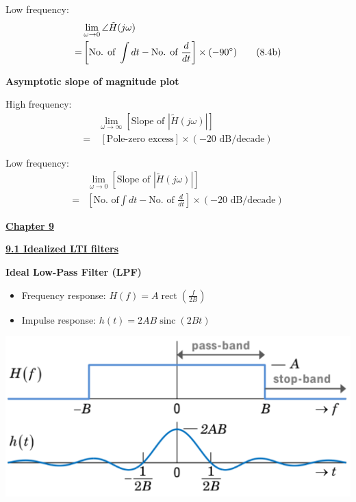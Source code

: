 \documentclass[landscape,a4paper]{extarticle}
\newenvironment{Figure}
  {\par\medskip\noindent\minipage{\linewidth}}
  {\endminipage\par\medskip}
\newcommand{\rect}[1]{\operatorname{rect}\left(#1\right)}
\newcommand{\sinc}[1]{\operatorname{sinc}\left(#1\right)}
\begin{document}
\begin{multicols*}{5}
    Low frequency:
    \begin{align*}
        &\lim_{\omega \to 0} \angle \tilde{H}(j \omega) \\
        =& \left[\text{No. of }\int dt - \text{No. of } \frac{d}{dt}\right] \times (-90 \degree) \tag{8.4b}
    \end{align*}

    \textbf{Asymptotic slope of magnitude plot}

    High frequency:
    \begin{align*}
        &\lim_{\omega \to \infty}\left[\text{Slope of } \left|\tilde{H}(j \omega)\right|\right]\\
        =&\ [\text{Pole-zero excess}] \times (-20 \text{ dB/decade}) \tag{8.5a}
    \end{align*}

    Low frequency:
    \begin{align*}
        &\lim_{\omega \to 0}\left[\text{Slope of } \left|\tilde{H}(j \omega)\right|\right]\\
        =& \left[\text{No. of} \int dt - \text{No. of } \frac{d}{dt}\right] \times (-20 \text{ dB/decade}) \tag{8.5a}
    \end{align*}

    \textbf{\uline{Chapter 9}}

    \textbf{\uline{9.1 Idealized LTI filters}}

    \textbf{Ideal Low-Pass Filter (LPF)}
    \begin{itemize}
        \item Frequency response: $H(f) = A\rect{\frac{f}{2B}}$
        \item Impulse response: $h(t) = 2AB\sinc{2Bt}$
    \end{itemize}

    \begin{Figure}
        \centering
        \includegraphics[width=\linewidth]{idealLPF.png}
    \end{Figure}


\end{multicols*}
\end{document}

